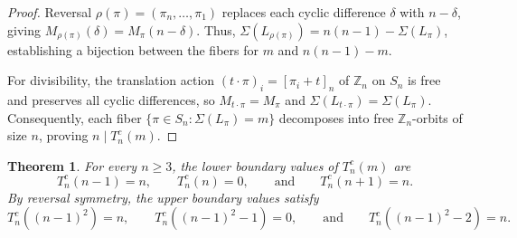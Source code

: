 \documentclass[11pt,a4paper]{amsart}
\newtheorem{theorem}{Theorem}[section]
\newcommand{\1}{\mathbf{1}}
\begin{document}
\begin{proof}
Reversal $\rho(\pi) = (\pi_n, \dots, \pi_1)$ replaces each cyclic difference $\delta$ with $n - \delta$, giving $M_{\rho(\pi)}(\delta) = M_\pi(n-\delta)$. Thus, $\Sigma(L_{\rho(\pi)}) = n(n-1) - \Sigma(L_\pi)$, establishing a bijection between the fibers for $m$ and $n(n-1) - m$.

For divisibility, the translation action $(t \cdot \pi)_i = [\pi_i + t]_n$ of $\mathbb{Z}_n$ on $S_n$ is free and preserves all cyclic differences, so $M_{t \cdot \pi} = M_\pi$ and $\Sigma(L_{t \cdot \pi}) = \Sigma(L_\pi)$. Consequently, each fiber $\{\pi \in S_n : \Sigma(L_\pi) = m\}$ decomposes into free $\mathbb{Z}_n$-orbits of size $n$, proving $n \mid T_n^c(m)$.
\end{proof}

\begin{theorem}
\label{thm:cyclic-boundary-ascents}
For every $n \ge 3$, the lower boundary values of $T_n^c(m)$ are
\begin{equation}
T_n^c(n-1) = n, \qquad T_n^c(n) = 0, \qquad \text{and} \qquad T_n^c(n+1) = n.
\end{equation}
By reversal symmetry, the upper boundary values satisfy
\begin{equation}
T_n^c\left((n-1)^2\right) = n, \qquad T_n^c\left((n-1)^2-1\right) = 0, \qquad \text{and} \qquad T_n^c\left((n-1)^2-2\right) = n.
\end{equation}
\end{theorem}
\end{document}
